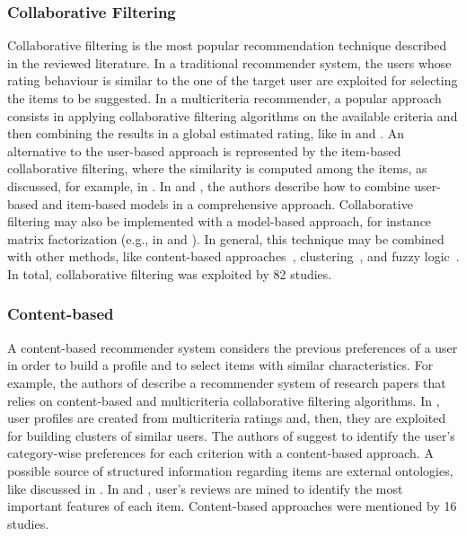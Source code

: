 \subsubsection{Collaborative Filtering}

Collaborative filtering is the most popular recommendation technique described in the reviewed literature. In a traditional recommender system, the users whose rating behaviour is similar to the one of the target user are exploited for selecting the items to be suggested. In a multicriteria recommender, a popular approach consists in applying collaborative filtering algorithms on the available criteria and then combining the results in a global estimated rating, like in  and . An alternative to the user-based approach is represented by the item-based collaborative filtering, where the similarity is computed among the items, as discussed, for example, in . In  and , the authors describe how to combine user-based and item-based models in a comprehensive approach. Collaborative filtering may also be implemented with a model-based approach, for instance matrix factorization (e.g., in  and ). In general, this technique may be combined with other methods, like content-based approaches~, clustering~, and fuzzy logic~. In total, collaborative filtering was exploited by 82 studies.

\subsubsection{Content-based}

A content-based recommender system considers the previous preferences of a user in order to build a profile and to select items with similar characteristics. For example, the authors of  describe a recommender system of research papers that relies on content-based and multicriteria collaborative filtering algorithms. In , user profiles are created from multicriteria ratings and, then, they are exploited for building clusters of similar users. The authors of  suggest to identify the user's category-wise preferences for each criterion with a content-based approach. A possible source of structured information regarding items are external ontologies, like discussed in . In  and , user's reviews are mined to identify the most important features of each item. Content-based approaches were mentioned by 16 studies.

